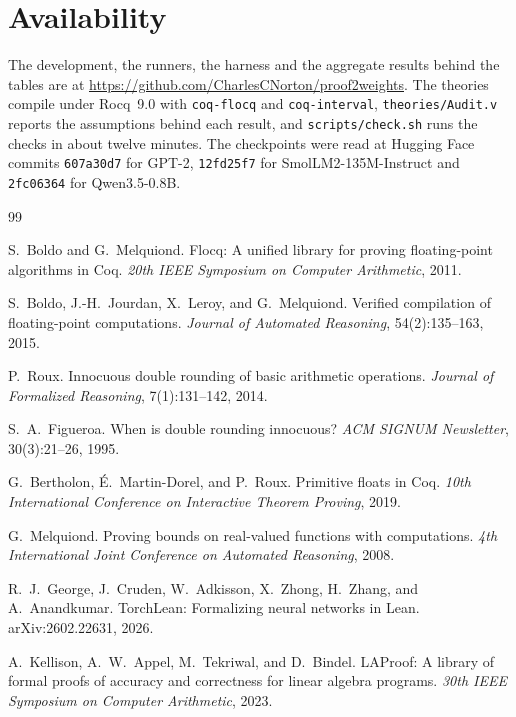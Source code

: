 \documentclass[11pt]{article}
\theoremstyle{plain}
\theoremstyle{definition}
\newcommand{\code}[1]{\texttt{#1}}
\begin{document}
\section*{Availability}

The development, the runners, the harness and the aggregate results behind the
tables are at \url{https://github.com/CharlesCNorton/proof2weights}. The
theories compile under Rocq~9.0 with \code{coq-flocq} and \code{coq-interval},
\code{theories/Audit.v} reports the assumptions behind each result, and
\code{scripts/check.sh} runs the checks in about twelve minutes. The
checkpoints were read at Hugging Face commits \code{607a30d7} for GPT-2,
\code{12fd25f7} for SmolLM2-135M-Instruct and \code{2fc06364} for Qwen3.5-0.8B.

\begin{thebibliography}{99}

S.~Boldo and G.~Melquiond.
\newblock Flocq: A unified library for proving floating-point algorithms in Coq.
\newblock \emph{20th IEEE Symposium on Computer Arithmetic}, 2011.

S.~Boldo, J.-H.~Jourdan, X.~Leroy, and G.~Melquiond.
\newblock Verified compilation of floating-point computations.
\newblock \emph{Journal of Automated Reasoning}, 54(2):135--163, 2015.

P.~Roux.
\newblock Innocuous double rounding of basic arithmetic operations.
\newblock \emph{Journal of Formalized Reasoning}, 7(1):131--142, 2014.

S.~A.~Figueroa.
\newblock When is double rounding innocuous?
\newblock \emph{ACM SIGNUM Newsletter}, 30(3):21--26, 1995.

G.~Bertholon, \'E.~Martin-Dorel, and P.~Roux.
\newblock Primitive floats in Coq.
\newblock \emph{10th International Conference on Interactive Theorem Proving}, 2019.

G.~Melquiond.
\newblock Proving bounds on real-valued functions with computations.
\newblock \emph{4th International Joint Conference on Automated Reasoning}, 2008.

R.~J.~George, J.~Cruden, W.~Adkisson, X.~Zhong, H.~Zhang, and A.~Anandkumar.
\newblock TorchLean: Formalizing neural networks in Lean.
\newblock arXiv:2602.22631, 2026.

A.~Kellison, A.~W.~Appel, M.~Tekriwal, and D.~Bindel.
\newblock LAProof: A library of formal proofs of accuracy and correctness for
  linear algebra programs.
\newblock \emph{30th IEEE Symposium on Computer Arithmetic}, 2023.


\end{thebibliography}
\end{document}

